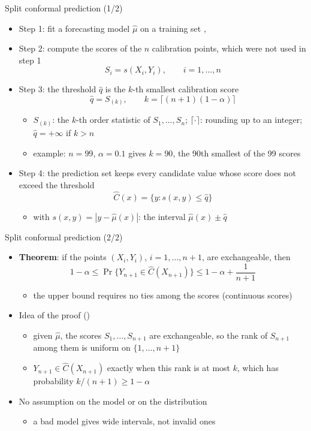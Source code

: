 \begin{frame}{Split conformal prediction (1/2)}
\itemsize{\small}
\begin{itemize}
    \item Step 1: fit a forecasting model $\hat\mu$ on a training set , 
    \item Step 2: compute the scores of the $n$ calibration points, which were not used in step 1 \[ S_i = s(X_i, Y_i), \qquad i = 1, \dots, n \]
    \item Step 3: the threshold $\hat q$ is the $k$-th smallest calibration score \[ \hat q = S_{(k)}, \qquad k = \lceil (n + 1)(1 - \alpha) \rceil \]
    \begin{itemize}
        \item $S_{(k)}$: the $k$-th order statistic of $S_1, \dots, S_n$; $\lceil\cdot\rceil$: rounding up to an integer; $\hat q = +\infty$ if $k > n$
        \item example: $n = 99$, $\alpha = 0.1$ gives $k = 90$, the 90th smallest of the 99 scores
    \end{itemize}
    \item Step 4: the prediction set keeps every candidate value whose score does not exceed the threshold \[ \hat C(x) = \{y: s(x, y) \le \hat q\} \]
    \begin{itemize}
        \item with $s(x, y) = |y - \hat\mu(x)|$: the interval $\hat\mu(x) \pm \hat q$
    \end{itemize}
\end{itemize}
\end{frame}

\begin{frame}{Split conformal prediction (2/2)}
\itemsize{\small}
\begin{itemize}
    \item \textbf{Theorem}: if the points $(X_i, Y_i)$, $i = 1, \dots, n + 1$, are exchangeable, then \[ 1 - \alpha \le \Pr\{Y_{n+1} \in \hat C(X_{n+1})\} \le 1 - \alpha + \frac{1}{n + 1} \]
    \begin{itemize}
        \item the upper bound requires no ties among the scores (continuous scores)
    \end{itemize}
    \item Idea of the proof ()
    \begin{itemize}
        \item given $\hat\mu$, the scores $S_1, \dots, S_{n+1}$ are exchangeable, so the rank of $S_{n+1}$ among them is uniform on $\{1, \dots, n + 1\}$
        \item $Y_{n+1} \in \hat C(X_{n+1})$ exactly when this rank is at most $k$, which has probability $k/(n + 1) \ge 1 - \alpha$
    \end{itemize}
    \item No assumption on the model or on the distribution
    \begin{itemize}
        \item a bad model gives wide intervals, not invalid ones
    \end{itemize}
\end{itemize}
\end{frame}

